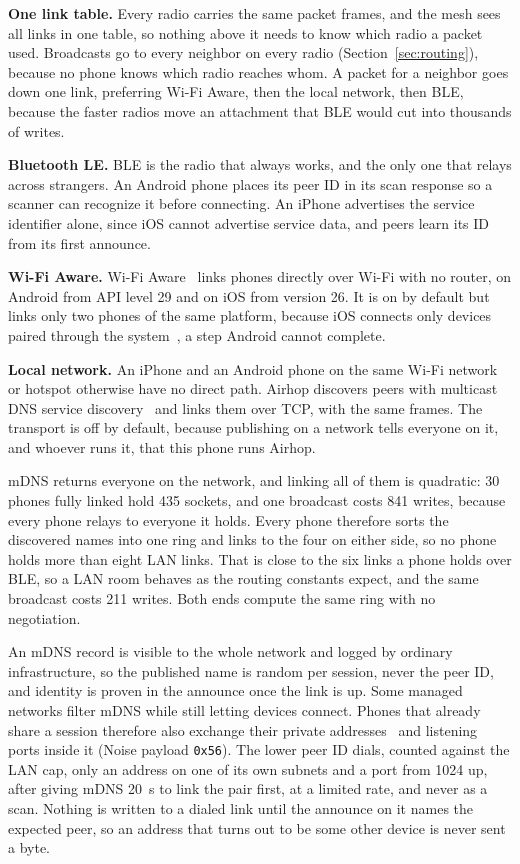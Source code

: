 \documentclass[conference]{IEEEtran}
\newcommand{\hx}[1]{\texttt{0x#1}}
\begin{document}
\textbf{One link table.} Every radio carries the same packet frames, and the mesh sees all links in one table, so nothing above it needs to know which radio a packet used. Broadcasts go to every neighbor on every radio (Section~\ref{sec:routing}), because no phone knows which radio reaches whom. A packet for a neighbor goes down one link, preferring Wi-Fi Aware, then the local network, then BLE, because the faster radios move an attachment that BLE would cut into thousands of writes.

\textbf{Bluetooth LE.} BLE is the radio that always works, and the only one that relays across strangers. An Android phone places its peer ID in its scan response so a scanner can recognize it before connecting. An iPhone advertises the service identifier alone, since iOS cannot advertise service data, and peers learn its ID from its first announce.

\textbf{Wi-Fi Aware.} Wi-Fi Aware~\cite{wifiaware} links phones directly over Wi-Fi with no router, on Android from API level 29 and on iOS from version 26. It is on by default but links only two phones of the same platform, because iOS connects only devices paired through the system~\cite{applewifiaware}, a step Android cannot complete.

\textbf{Local network.} An iPhone and an Android phone on the same Wi-Fi network or hotspot otherwise have no direct path. Airhop discovers peers with multicast DNS service discovery~\cite{rfc6762,rfc6763} and links them over TCP, with the same frames. The transport is off by default, because publishing on a network tells everyone on it, and whoever runs it, that this phone runs Airhop.

mDNS returns everyone on the network, and linking all of them is quadratic: 30 phones fully linked hold 435 sockets, and one broadcast costs 841 writes, because every phone relays to everyone it holds. Every phone therefore sorts the discovered names into one ring and links to the four on either side, so no phone holds more than eight LAN links. That is close to the six links a phone holds over BLE, so a LAN room behaves as the routing constants expect, and the same broadcast costs 211 writes. Both ends compute the same ring with no negotiation.

An mDNS record is visible to the whole network and logged by ordinary infrastructure, so the published name is random per session, never the peer ID, and identity is proven in the announce once the link is up. Some managed networks filter mDNS while still letting devices connect. Phones that already share a session therefore also exchange their private addresses~\cite{rfc1918} and listening ports inside it (Noise payload \hx{56}). The lower peer ID dials, counted against the LAN cap, only an address on one of its own subnets and a port from 1024 up, after giving mDNS 20~s to link the pair first, at a limited rate, and never as a scan. Nothing is written to a dialed link until the announce on it names the expected peer, so an address that turns out to be some other device is never sent a byte.
\end{document}
